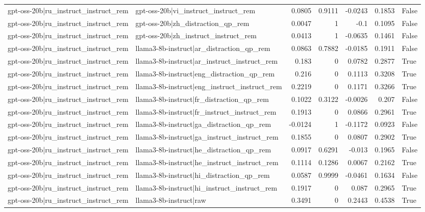 \begin{table}
\begin{tabular}{l l r r r r l}
gpt-oss-20b|ru_instruct_instruct_rem & gpt-oss-20b|vi_instruct_instruct_rem & 0.0805 & 0.9111 & -0.0243 & 0.1853 & False \\
gpt-oss-20b|ru_instruct_instruct_rem & gpt-oss-20b|zh_distraction_qp_rem & 0.0047 & 1 & -0.1 & 0.1095 & False \\
gpt-oss-20b|ru_instruct_instruct_rem & gpt-oss-20b|zh_instruct_instruct_rem & 0.0413 & 1 & -0.0635 & 0.1461 & False \\
gpt-oss-20b|ru_instruct_instruct_rem & llama3-8b-instruct|ar_distraction_qp_rem & 0.0863 & 0.7882 & -0.0185 & 0.1911 & False \\
gpt-oss-20b|ru_instruct_instruct_rem & llama3-8b-instruct|ar_instruct_instruct_rem & 0.183 & 0 & 0.0782 & 0.2877 & True \\
gpt-oss-20b|ru_instruct_instruct_rem & llama3-8b-instruct|eng_distraction_qp_rem & 0.216 & 0 & 0.1113 & 0.3208 & True \\
gpt-oss-20b|ru_instruct_instruct_rem & llama3-8b-instruct|eng_instruct_instruct_rem & 0.2219 & 0 & 0.1171 & 0.3266 & True \\
gpt-oss-20b|ru_instruct_instruct_rem & llama3-8b-instruct|fr_distraction_qp_rem & 0.1022 & 0.3122 & -0.0026 & 0.207 & False \\
gpt-oss-20b|ru_instruct_instruct_rem & llama3-8b-instruct|fr_instruct_instruct_rem & 0.1913 & 0 & 0.0866 & 0.2961 & True \\
gpt-oss-20b|ru_instruct_instruct_rem & llama3-8b-instruct|ga_distraction_qp_rem & -0.0124 & 1 & -0.1172 & 0.0923 & False \\
gpt-oss-20b|ru_instruct_instruct_rem & llama3-8b-instruct|ga_instruct_instruct_rem & 0.1855 & 0 & 0.0807 & 0.2902 & True \\
gpt-oss-20b|ru_instruct_instruct_rem & llama3-8b-instruct|he_distraction_qp_rem & 0.0917 & 0.6291 & -0.013 & 0.1965 & False \\
gpt-oss-20b|ru_instruct_instruct_rem & llama3-8b-instruct|he_instruct_instruct_rem & 0.1114 & 0.1286 & 0.0067 & 0.2162 & True \\
gpt-oss-20b|ru_instruct_instruct_rem & llama3-8b-instruct|hi_distraction_qp_rem & 0.0587 & 0.9999 & -0.0461 & 0.1634 & False \\
gpt-oss-20b|ru_instruct_instruct_rem & llama3-8b-instruct|hi_instruct_instruct_rem & 0.1917 & 0 & 0.087 & 0.2965 & True \\
gpt-oss-20b|ru_instruct_instruct_rem & llama3-8b-instruct|raw & 0.3491 & 0 & 0.2443 & 0.4538 & True \\

\end{tabular}
\end{table}
